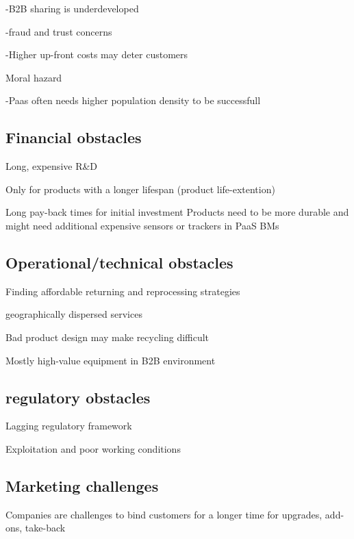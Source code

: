 \documentclass[a4paper,man,10pt]{apa6}
\begin{document}
-B2B sharing is underdeveloped

-fraud and trust concerns 

-Higher up-front costs may deter customers

Moral hazard

-Paas often needs higher population density to be successfull \citep{Menkveld2018}

\subsection{Financial obstacles}\label{subsec:financial}

Long, expensive R\&D 

Only for products with a longer lifespan (product life-extention)

Long pay-back times for initial investment
Products need to be more durable and might need additional expensive sensors or trackers in PaaS BMs \citep{Menkveld2018}

\subsection{Operational/technical obstacles}

Finding affordable returning and reprocessing strategies

geographically dispersed services

Bad product design may make recycling difficult

Mostly high-value equipment in B2B environment

\subsection{regulatory obstacles}\label{subsec:regulation}
Lagging regulatory framework

Exploitation and poor working conditions

\subsection{Marketing challenges}\label{subsec:marketing}
Companies are challenges to bind customers for a longer time for upgrades, add-ons, take-back 
\end{document}
